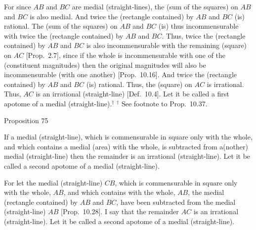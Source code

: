 For since $AB$ and $BC$ are medial (straight-lines), the (sum of the squares)
on $AB$ and $BC$ is also medial. And twice the (rectangle contained)
by $AB$ and $BC$ (is) rational. The (sum of the squares) on $AB$
and $BC$ (is) thus incommensurable with twice the (rectangle contained)
by $AB$ and $BC$. Thus, twice the (rectangle contained) by
$AB$ and $BC$ is also incommensurable with the remaining (square) on $AC$ [Prop.~2.7], since  if the whole is
incommensurable with one of the (constituent magnitudes)   then the original magnitudes will also be incommensurable (with one another) [Prop.~10.16]. And twice the (rectangle
contained) by $AB$ and $BC$ (is) rational. Thus, the (square) on $AC$
is irrational. Thus, $AC$ is an irrational (straight-line) [Def.~10.4]. Let it be called a first apotome
of a medial (straight-line).$^\dag$
{\footnotesize\noindent $^\dag$ See footnote to Prop.~10.37.} 


\begin{center}
{\large Proposition 75}
\end{center}

If  a medial (straight-line), which is commensurable in square only
with the whole, and which contains a medial (area) with the whole, is subtracted from a(nother) medial
(straight-line)   then
the remainder is an irrational (straight-line). Let it be called a second apotome of a medial (straight-line).

For let the medial (straight-line) $CB$, which is commensurable in square
only with the whole, $AB$, and which contains with the whole, $AB$, the
medial (rectangle contained) by $AB$ and $BC$, have been subtracted from the medial (straight-line) $AB$ [Prop.~10.28].  I say that the remainder $AC$ is an
irrational (straight-line). Let it be called a second apotome of a medial (straight-line).

\epsfysize=1.7in 
\centerline{}

